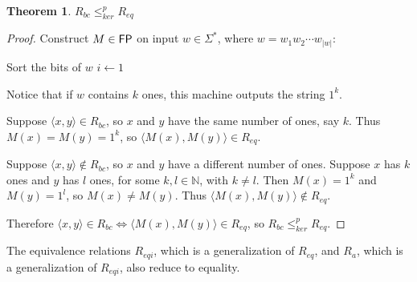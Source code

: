 \documentclass{article}
\newtheorem{theorem}{Theorem}[section]
\theoremstyle{definition} \newtheorem{definition}[definition]{Definition}
\newcommand{\sigmastar}{\Sigma^{*}} %
\newcommand{\kr}{\leq^{p}_{ker}} %
\newcommand{\pair}[2]{\langle#1,#2\rangle} %
\begin{document}
\begin{theorem}$R_{bc}\kr R_{eq}$\end{theorem}
\begin{proof}
  Construct $M\in {\ensuremath{\mathsf{FP}}}$ on input $w\in\sigmastar$, where $w=w_1w_2\cdots
  w_{|w|}$:\\
  \begin{algorithm}[H]
    Sort the bits of $w$\;
    $i\gets1$\;
  \end{algorithm}
  Notice that if $w$ contains $k$ ones, this machine outputs the string $1^k$.

  Suppose $\pair{x}{y}\in R_{bc}$, so $x$ and $y$ have the same number of ones,
  say $k$. Thus $M(x)=M(y)=1^k$, so $\pair{M(x)}{M(y)}\in R_{eq}$.
  
  Suppose $\pair{x}{y}\notin R_{bc}$, so $x$ and $y$ have a different number of
  ones. Suppose $x$ has $k$ ones and $y$ has $l$ ones, for some
  $k,l\in\mathbb{N}$, with $k\neq l$. Then $M(x)=1^{k}$ and $M(y)=1^{l}$, so
  $M(x)\neq M(y)$. Thus $\pair{M(x)}{M(y)}\notin R_{eq}$.

  Therefore $\pair{x}{y}\in R_{bc} \iff \pair{M(x)}{M(y)}\in R_{eq}$, so
  $R_{bc}\kr R_{eq}$.
\end{proof}

The equivalence relations $R_{eqi}$, which is a generalization of $R_{eq}$, and
$R_a$, which is a generalization of $R_{eqi}$, also reduce to equality.
\end{document}
